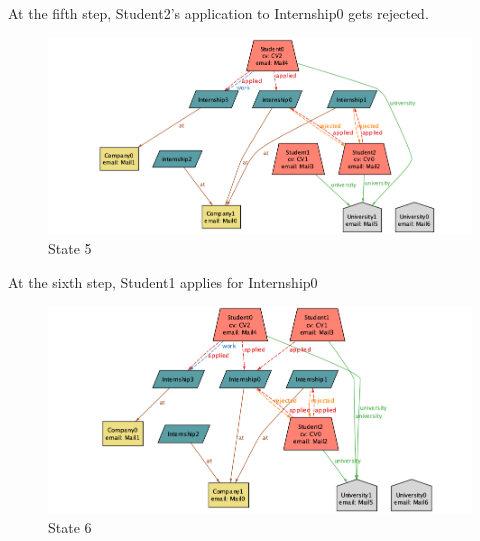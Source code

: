 At the fifth step, Student2's application to Internship0 gets rejected.

\begin{figure} [H]
    \centering
    \includegraphics[width=1\linewidth]{Alloy/State5.png}
    \caption{State 5}
\end{figure}

At the sixth step, Student1 applies for Internship0

\begin{figure} [H]
    \centering
    \includegraphics[width=1\linewidth]{Alloy/State6.png}
    \caption{State 6}
\end{figure}